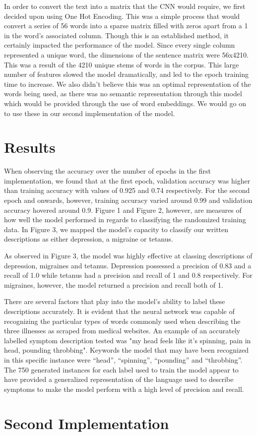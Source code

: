 \documentclass[12pt]{report}
\begin{document}
In order to convert the text into a matrix that the CNN would require, we first decided
upon using One Hot Encoding. This was a simple process that would convert a series of 56
words into a sparse matrix filled with zeros apart from a 1 in the word’s associated column.
Though this is an established method, it certainly impacted the performance of the model.
Since every single column represented a unique word, the dimensions of the sentence matrix
were 56x4210. This was a result of the 4210 unique stems of words in the corpus. This large
number of features slowed the model dramatically, and led to the epoch training time to increase.
We also didn’t believe this was an optimal representation of the words being used, as there was
no semantic representation through this model which would be provided through the use of word
embeddings. We would go on to use these in our second implementation of the model.

\section{Results}
When observing the accuracy over the number of epochs in the first implementation,
we found that at the first epoch, validation accuracy was higher than training
accuracy with values of 0.925 and 0.74 respectively. For the second epoch and onwards,
however, training accuracy varied around 0.99 and validation accuracy hovered around
0.9. Figure 1 and Figure 2, however, are measures of how well the model performed
in regards to classifying the randomized training data. In Figure 3, we mapped the
model’s capacity to classify our written descriptions as either depression, a
migraine or tetanus.

As observed in Figure 3, the model was highly effective at classing descriptions of
depression, migraines and tetanus. Depression possessed a precision of 0.83 and a
recall of 1.0 while tetanus had a precision and recall of 1 and 0.8 respectively.
For migraines, however, the model returned a precision and recall both of 1.

There are several factors that play into the model’s ability to label these descriptions
accurately. It is evident that the neural network was capable of recognizing the particular
types of words commonly used when describing the three illnesses as scraped from medical
websites. An example of an accurately labelled symptom description tested was "my head
feels like it's spinning, pain in head, pounding throbbing". Keywords the model that
may have been recognized in this specific instance were “head”, “spinning”, “pounding” and
“throbbing”. The 750 generated instances for each label used to train the model appear to
have provided a generalized representation of the language used to describe symptoms to make
the model perform with a high level of precision and recall.

\section{Second Implementation}


%
\end{document}
